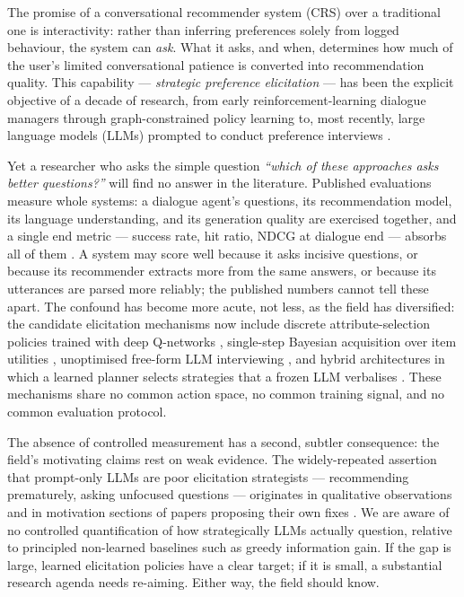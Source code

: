 \documentclass[11pt]{article}
\begin{document}
The promise of a conversational recommender system (CRS) over a traditional
one is interactivity: rather than inferring preferences solely from logged
behaviour, the system can \emph{ask}. What it asks, and when, determines how
much of the user's limited conversational patience is converted into
recommendation quality. This capability --- \emph{strategic preference
elicitation} --- has been the explicit objective of a decade of research,
from early reinforcement-learning dialogue managers \citep{sun2018conversational,
lei2020estimation} through graph-constrained policy learning
\citep{lei2020interactive, deng2021unified} to, most recently, large language
models (LLMs) prompted to conduct preference interviews
\citep{li2023eliciting, he2023large}.

Yet a researcher who asks the simple question \emph{``which of these
approaches asks better questions?''} will find no answer in the literature.
Published evaluations measure whole systems: a dialogue agent's questions,
its recommendation model, its language understanding, and its generation
quality are exercised together, and a single end metric --- success rate,
hit ratio, NDCG at dialogue end --- absorbs all of them
\citep{jannach2021survey, wang2023rethinking}. A system may score well
because it asks incisive questions, or because its recommender extracts more
from the same answers, or because its utterances are parsed more reliably;
the published numbers cannot tell these apart. The confound has become more
acute, not less, as the field has diversified: the candidate elicitation
mechanisms now include discrete attribute-selection policies trained with
deep Q-networks \citep{deng2021unified, zhao2023hierarchical}, single-step
Bayesian acquisition over item utilities \citep{austin2024bayesian},
unoptimised free-form LLM interviewing \citep{li2023eliciting}, and hybrid
architectures in which a learned planner selects strategies that a frozen
LLM verbalises \citep{deng2023plug, zhao2025reinforced}. These mechanisms
share no common action space, no common training signal, and no common
evaluation protocol.

The absence of controlled measurement has a second, subtler consequence:
the field's motivating claims rest on weak evidence. The widely-repeated
assertion that prompt-only LLMs are poor elicitation strategists ---
recommending prematurely, asking unfocused questions --- originates in
qualitative observations and in motivation sections of papers proposing
their own fixes \citep{he2023large, zhao2025reinforced, kostric2025should}.
We are aware of no controlled quantification of how strategically LLMs
actually question, relative to principled non-learned baselines such as
greedy information gain. If the gap is large, learned elicitation policies
have a clear target; if it is small, a substantial research agenda needs
re-aiming. Either way, the field should know.
\end{document}
